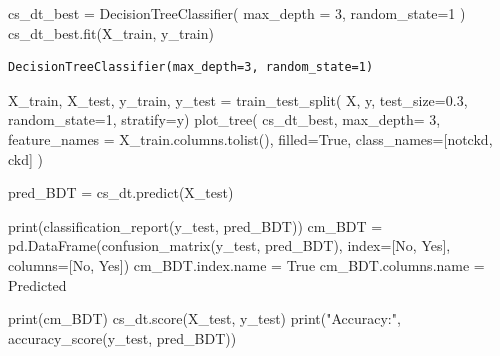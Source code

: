 \documentclass[
  11pt,
  letterpaper,
  DIV=11,
  numbers=noendperiod]{scrartcl}
\newenvironment{Shaded}{\begin{snugshade}}{\end{snugshade}}
\newcommand{\BuiltInTok}[1]{\textcolor[rgb]{0.00,0.23,0.31}{#1}}
\newcommand{\DecValTok}[1]{\textcolor[rgb]{0.68,0.00,0.00}{#1}}
\newcommand{\FloatTok}[1]{\textcolor[rgb]{0.68,0.00,0.00}{#1}}
\newcommand{\NormalTok}[1]{\textcolor[rgb]{0.00,0.23,0.31}{#1}}
\newcommand{\OperatorTok}[1]{\textcolor[rgb]{0.37,0.37,0.37}{#1}}
\newcommand{\StringTok}[1]{\textcolor[rgb]{0.13,0.47,0.30}{#1}}
\newcommand{\VariableTok}[1]{\textcolor[rgb]{0.07,0.07,0.07}{#1}}
\begin{document}
\begin{Shaded}
\begin{Highlighting}[]
\NormalTok{cs\_dt\_best }\OperatorTok{=}\NormalTok{ DecisionTreeClassifier(}
\NormalTok{    max\_depth }\OperatorTok{=} \DecValTok{3}\NormalTok{, }
\NormalTok{    random\_state}\OperatorTok{=}\DecValTok{1}
\NormalTok{    ) }
\NormalTok{cs\_dt\_best.fit(X\_train, y\_train)}
\end{Highlighting}
\end{Shaded}

\begin{verbatim}
DecisionTreeClassifier(max_depth=3, random_state=1)
\end{verbatim}

\begin{Shaded}
\begin{Highlighting}[]
\NormalTok{X\_train, X\_test, y\_train, y\_test }\OperatorTok{=}\NormalTok{ train\_test\_split(}
\NormalTok{    X, y, test\_size}\OperatorTok{=}\FloatTok{0.3}\NormalTok{, random\_state}\OperatorTok{=}\DecValTok{1}\NormalTok{, stratify}\OperatorTok{=}\NormalTok{y)}
\NormalTok{plot\_tree(}
\NormalTok{    cs\_dt\_best, }
\NormalTok{    max\_depth}\OperatorTok{=} \DecValTok{3}\NormalTok{, }
\NormalTok{    feature\_names }\OperatorTok{=}\NormalTok{ X\_train.columns.tolist(), }
\NormalTok{    filled}\OperatorTok{=}\VariableTok{True}\NormalTok{,}
\NormalTok{    class\_names}\OperatorTok{=}\NormalTok{[}\StringTok{\textquotesingle{}notckd\textquotesingle{}}\NormalTok{, }\StringTok{\textquotesingle{}ckd\textquotesingle{}}\NormalTok{]}
\NormalTok{)}

\NormalTok{pred\_BDT }\OperatorTok{=}\NormalTok{ cs\_dt.predict(X\_test)}

\BuiltInTok{print}\NormalTok{(classification\_report(y\_test, pred\_BDT))}
\NormalTok{cm\_BDT }\OperatorTok{=}\NormalTok{ pd.DataFrame(confusion\_matrix(y\_test, pred\_BDT), index}\OperatorTok{=}\NormalTok{[}\StringTok{\textquotesingle{}No\textquotesingle{}}\NormalTok{, }\StringTok{\textquotesingle{}Yes\textquotesingle{}}\NormalTok{], columns}\OperatorTok{=}\NormalTok{[}\StringTok{\textquotesingle{}No\textquotesingle{}}\NormalTok{, }\StringTok{\textquotesingle{}Yes\textquotesingle{}}\NormalTok{])}
\NormalTok{cm\_BDT.index.name }\OperatorTok{=} \StringTok{\textquotesingle{}True\textquotesingle{}}
\NormalTok{cm\_BDT.columns.name }\OperatorTok{=} \StringTok{\textquotesingle{}Predicted\textquotesingle{}}

\BuiltInTok{print}\NormalTok{(cm\_BDT)}
\NormalTok{cs\_dt.score(X\_test, y\_test)}
\BuiltInTok{print}\NormalTok{(}\StringTok{"Accuracy:"}\NormalTok{, accuracy\_score(y\_test, pred\_BDT))}
\end{Highlighting}
\end{Shaded}
\end{document}

